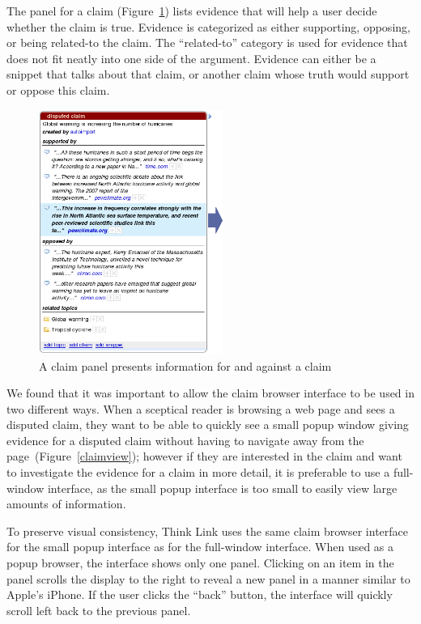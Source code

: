 \documentclass{chi2009}
\begin{document}
The panel for a claim (Figure~\ref{panel}) lists evidence that will help a user decide whether the claim is true. Evidence is categorized as either supporting, opposing, or being related-to the claim. The ``related-to'' category is used for evidence that does not fit neatly into one side of the argument. Evidence can either be a snippet that talks about that claim, or another claim whose truth would support or oppose this claim. 

\begin{figure}[tb]
	\begin{center}
	\includegraphics[width=6cm]{../screenshots/v2_panel.png}
	\caption{A claim panel presents information for and against a claim}
	\label{panel}
	\end{center}
\end{figure}

We found that it was important to allow the claim browser interface to be used in two different ways. When a sceptical reader is browsing a web page and sees a disputed claim, they want to be able to quickly see a small popup window giving evidence for a disputed claim without having to navigate away from the page~(Figure~\ref{claimview}); however if they are interested in the claim and want to investigate the evidence for a claim in more detail, it is preferable to use a full-window interface, as the small popup interface is too small to easily view large amounts of information.

To preserve visual consistency, Think Link uses the same claim browser interface for the small popup interface as for the full-window interface. When used as a popup browser, the interface shows only one panel. Clicking on an item in the panel scrolls the display to the right to reveal a new panel in a manner similar to Apple's iPhone. If the user clicks the ``back'' button, the interface will quickly scroll left back to the previous panel.
\end{document}
